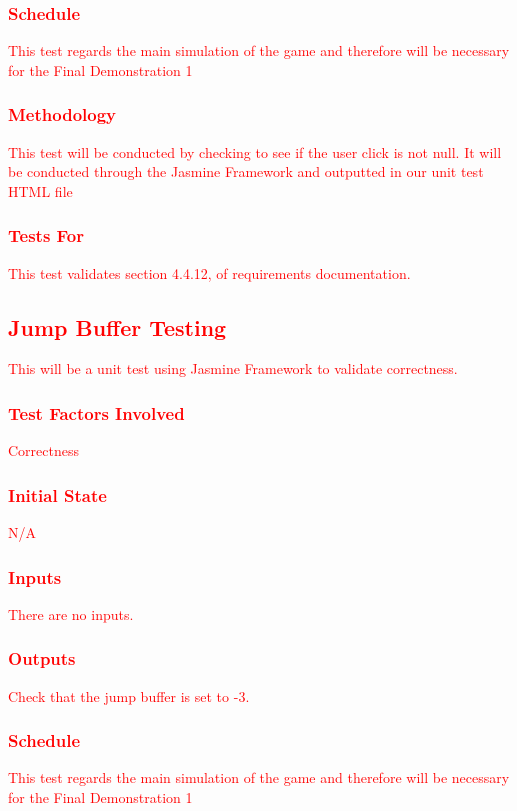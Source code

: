 \documentclass[11pt, oneside]{article}   	%
\begin{document}
\subsubsection{\textcolor{red}{Schedule}}
\textcolor{red}{This test regards the main simulation of the game and therefore will be necessary for the Final Demonstration 1}
\subsubsection{\textcolor{red}{Methodology}}
\textcolor{red}{This test will be conducted by checking to see if the user click is not null. It will be conducted through the Jasmine Framework and outputted in our unit test HTML file}
\subsubsection{\textcolor{red}{Tests For}}
\textcolor{red}{This test validates section 4.4.12, of requirements documentation.}



\subsection{\textcolor{red}{Jump Buffer Testing}}
\textcolor{red}{This will be a unit test using Jasmine Framework to validate correctness.}
\subsubsection{\textcolor{red}{Test Factors Involved}}
\textcolor{red}{Correctness}
\subsubsection{\textcolor{red}{Initial State}}
\textcolor{red}{N/A}
\subsubsection{\textcolor{red}{Inputs}}
\textcolor{red}{There are no inputs.}
\subsubsection{\textcolor{red}{Outputs}}
\textcolor{red}{Check that the jump buffer is set to -3.}
\subsubsection{\textcolor{red}{Schedule}}
\textcolor{red}{This test regards the main simulation of the game and therefore will be necessary for the Final Demonstration 1}
\end{document}

